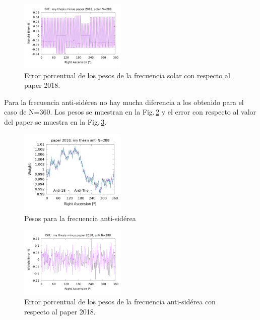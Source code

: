 \begin{figure}[H]
	\centering
	\includegraphics[width=0.45\textwidth]{Graficos/solar_my_and_paper_in_288_error.png}
	\caption{Error porcentual de los pesos de la frecuencia solar con respecto al paper 2018.}
	\label{fig:error_288_solar}
\end{figure}

Para la frecuencia anti-sidérea no hay mucha diferencia a los obtenido para el caso de N=360. Los pesos se muestran en la Fig.\,\ref{fig:anti_288} y el error con respecto al valor del paper se muestra en la Fig.\,\ref{fig:error_288_anti}.

\begin{figure}[H]
	\centering
	\includegraphics[width=0.45\textwidth]{Graficos/anti_my_and_paper_2018_in_288.png}
	\caption{Pesos para la frecuencia anti-sidérea}
	\label{fig:anti_288}
\end{figure}


\begin{figure}[H]
	\centering
	\includegraphics[width=0.45\textwidth]{Graficos/anti_my_and_paper_in_288_error.png}
	\caption{Error porcentual de los pesos de la frecuencia anti-sidérea con respecto al paper 2018.}
	\label{fig:error_288_anti}
\end{figure}
